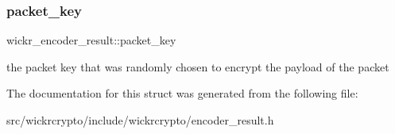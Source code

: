 \subsubsection{\texorpdfstring{packet\_key}{packet\_key}}
{\footnotesize\ttfamily wickr\+\_\+encoder\+\_\+result\+::packet\+\_\+key}

the packet key that was randomly chosen to encrypt the payload of the packet 

The documentation for this struct was generated from the following file\+:\begin{DoxyCompactItemize}
\item 
src/wickrcrypto/include/wickrcrypto/encoder\+\_\+result.\+h\end{DoxyCompactItemize}
